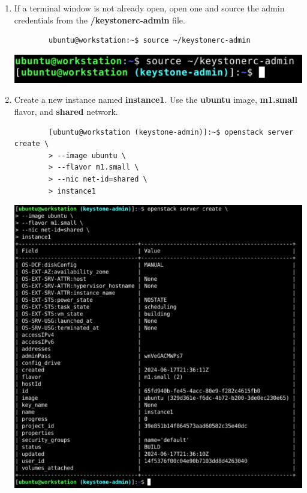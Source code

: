 \documentclass[letterpaper, 12pt]{article}
\begin{document}
\begin{enumerate}
    \item If a terminal window is not already open, open one and source the admin credentials from the 
    \textbf{\texttildemid/keystonerc-admin} file.
    \begin{lstlisting}
        ubuntu@workstation:~$ source ~/keystonerc-admin
    \end{lstlisting}

    \begin{center}
        \includegraphics[width=\linewidth]{images/part3/step1.png}
    \end{center}

    \item Create a new instance named \textbf{instance1}. Use the \textbf{ubuntu} image, \textbf{m1.small} flavor, and
    \textbf{shared} network.
    \begin{lstlisting}
        [ubuntu@workstation (keystone-admin)]:~$ openstack server create \
        > --image ubuntu \
        > --flavor m1.small \
        > --nic net-id=shared \
        > instance1
    \end{lstlisting}

    \begin{center}
        \includegraphics[width=\linewidth]{images/part3/step2.png}
    \end{center}


\end{enumerate}
\end{document}
